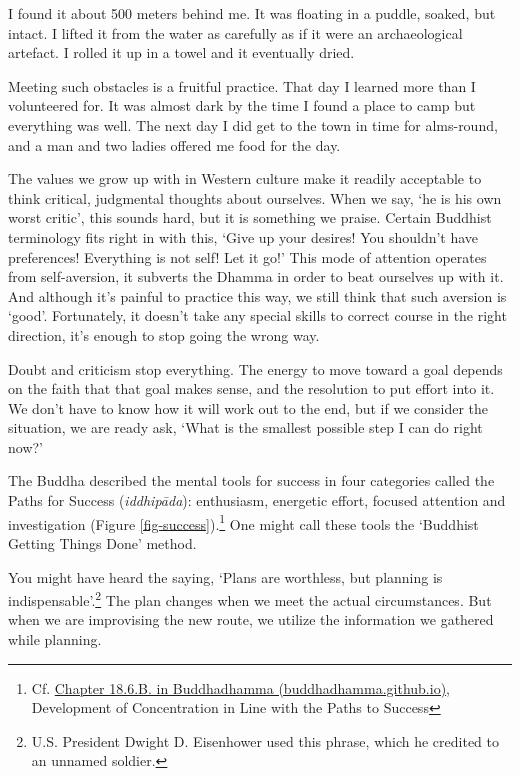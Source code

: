 I found it about 500 meters behind me. It was floating in a puddle,
soaked, but intact. I lifted it from the water as carefully as if it
were an archaeological artefact. I rolled it up in a towel and it
eventually dried.

Meeting such obstacles is a fruitful practice. That day I learned more
than I volunteered for. It was almost dark by the time I found a place
to camp but everything was well. The next day I did get to the town in
time for alms-round, and a man and two ladies offered me food for the
day.

The values we grow up with in Western culture make it readily acceptable
to think critical, judgmental thoughts about ourselves. When we say, `he
is his own worst critic', this sounds hard, but it is something we
praise. Certain Buddhist terminology fits right in with this, `Give up
your desires! You shouldn't have preferences! Everything is not self!
Let it go!' This mode of attention operates from self-aversion, it
subverts the Dhamma in order to beat ourselves up with it. And although
it's painful to practice this way, we still think that such aversion is
`good'. Fortunately, it doesn't take any special skills to correct
course in the right direction, it's enough to stop going the wrong way.


Doubt and criticism stop everything. The energy to move toward a goal
depends on the faith that that goal makes sense, and the resolution to
put effort into it. We don't have to know how it will work out to the
end, but if we consider the situation, we are ready ask, `What is the
smallest possible step I can do right now?'

The Buddha described the mental tools for success in four categories
called the Paths for Success (\emph{iddhipāda}): enthusiasm, energetic
effort, focused attention and investigation (Figure
\ref{fig-success}).\footnote{Cf.
  \href{https://buddhadhamma.github.io/path-factors-of-concentration.html\#development-of-concentration-in-line-with-the-paths-to-success}{Chapter
  18.6.B. in Buddhadhamma (buddhadhamma.github.io)}, Development of
  Concentration in Line with the Paths to Success} One might call these
tools the `Buddhist Getting Things Done' method.


\enlargethispage*{\baselineskip}

You might have heard the saying, `Plans are worthless, but planning is
indispensable'.\footnote{U.S. President Dwight D. Eisenhower used this
  phrase, which he credited to an unnamed soldier.} The plan changes
when we meet the actual circumstances. But when we are improvising the
new route, we utilize the information we gathered while planning.

